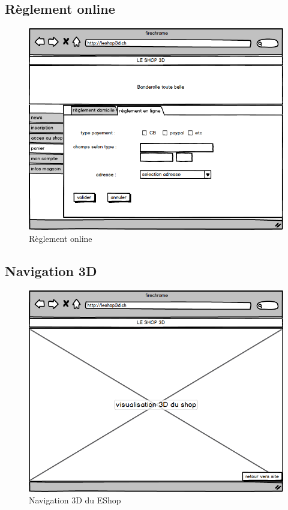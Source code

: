\documentclass[12pt]{article}
\begin{document}
\newpage
\subsection{Règlement online}

\begin{figure}[ht]
    \center
    \includegraphics[scale=0.6]{../Maquettes/reglement_online.jpeg}
    \caption*{Règlement online}
\end{figure}

\newpage
\subsection{Navigation 3D}

\begin{figure}[ht]
    \center
    \includegraphics[scale=0.6]{../Maquettes/nav_3D.jpeg}
    \caption*{Navigation 3D du EShop}
\end{figure}
\end{document}
